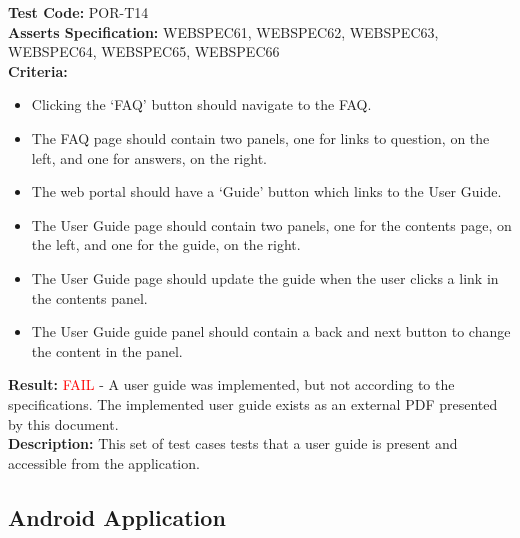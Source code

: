\documentclass[11pt,a4paper]{report}
\begin{document}
\label{test:POR-T14}
\noindent\textbf{Test Code:} POR-T14\\
\textbf{Asserts Specification:} WEBSPEC61, WEBSPEC62, WEBSPEC63, WEBSPEC64, WEBSPEC65, WEBSPEC66\\ 
\textbf{Criteria:} \begin{itemize}
                     \item  Clicking the `FAQ' button should navigate to the FAQ.
                     \item The FAQ page should contain two panels, one for links to question, on the left, and one for answers, on the right.
                     \item The web portal should have a `Guide' button which links to the User Guide.
                     \item The User Guide page should contain two panels, one for the contents page, on the left, and one for the guide, on the right.
                     \item The User Guide page should update the guide when the user clicks a link in the contents panel.
                     \item The User Guide guide panel should contain a back and next button to change the content in the panel.
                   \end{itemize}  
\textbf{Result:} \textcolor{red}{FAIL} - A user guide was implemented, but not according to the specifications. The implemented user guide exists as an external PDF presented by this document.\\
\textbf{Description:} This set of test cases tests that a user guide is present and accessible from the application. \\

\subsection{Android Application}
\end{document}
